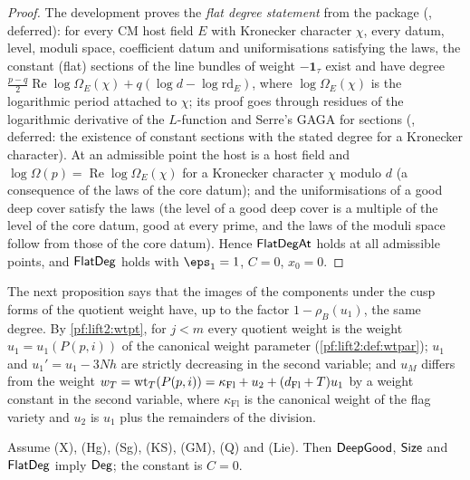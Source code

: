 \begin{proof}
The development proves the \emph{flat degree statement} from the package
(, deferred): for every CM host field $E$ with Kronecker
character $\chi$, every datum, level, moduli space, coefficient datum and uniformisations satisfying the laws, the
constant (flat) sections of the line bundles of weight $-\mathbf 1_\tau$ exist and have degree
$\frac{p-q}2\operatorname{Re}\log\Omega_E(\chi)+q(\log d-\log\mathrm{rd}_E)$, where $\log\Omega_E(\chi)$ is the
logarithmic period attached to $\chi$; its proof goes through residues of the logarithmic derivative of the $L$-function and Serre's GAGA
for sections (, deferred: the existence of constant
sections with the stated degree for a Kronecker character). At an admissible point the host is a host field and
$\log\Omega(p)=\operatorname{Re}\log\Omega_E(\chi)$ for a Kronecker character $\chi$ modulo $d$ (a consequence of the
laws of the core datum); and the uniformisations of a good deep cover satisfy the laws (the level of a good deep cover is a
multiple of the level of the core datum, good at every prime, and the laws of the moduli space follow from those of
the core datum). Hence $\mathsf{FlatDegAt}$ holds at all admissible points, and $\mathsf{FlatDeg}$ holds with
$\eps_1=1$, $C=0$, $x_0=0$.
\end{proof}

The next proposition says that the images of the components under the cusp forms of the quotient weight have, up
to the factor $1-\rho_B(u_1)$, the same degree. By \cref{pf:lift2:wtpt}, for $j<m$ every quotient weight is the weight
$u_1=u_1(P(p,i))$ of the canonical weight parameter (\cref{pf:lift2:def:wtpar}); $u_1$ and $u_1'=u_1-3Nh$ are strictly
decreasing in the second variable; and $u_M$ differs from the weight $w_T=\mathrm{wt}_T(P(p,i))=\kappa_{\mathrm{Fl}}+u_2+
(d_{\mathrm{Fl}}+T)u_1$ by a weight constant in the second variable, where $\kappa_{\mathrm{Fl}}$ is the canonical weight of
the flag variety and $u_2$ is $u_1$ plus the remainders of the division.

\begin{proposition}\label{pf:lift2:deg}
Assume \textup{(X)}, \textup{(Hg)}, \textup{(Sg)}, \textup{(KS)}, \textup{(GM)}, \textup{(Q)} and \textup{(Lie)}.
Then $\mathsf{DeepGood}$, $\mathsf{Size}$ and $\mathsf{FlatDeg}$ imply $\mathsf{Deg}$; the constant is $C=0$.
\end{proposition}

